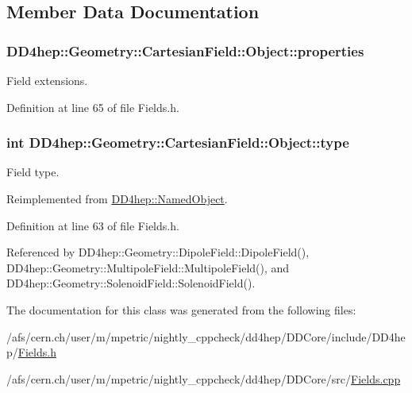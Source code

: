 \subsection{Member Data Documentation}
\hypertarget{class_d_d4hep_1_1_geometry_1_1_cartesian_field_1_1_object_a146cdd5fa292df237112a461ccaa0f6c}{
\subsubsection[{properties}]{ {\bf DD4hep::Geometry::CartesianField::Object::properties}}}
\label{class_d_d4hep_1_1_geometry_1_1_cartesian_field_1_1_object_a146cdd5fa292df237112a461ccaa0f6c}


Field extensions. 

Definition at line 65 of file Fields.h.\hypertarget{class_d_d4hep_1_1_geometry_1_1_cartesian_field_1_1_object_a661abde32b68651dc0542aabbe9e448c}{
\subsubsection[{type}]{\setlength{\rightskip}{0pt plus 5cm}int {\bf DD4hep::Geometry::CartesianField::Object::type}}}
\label{class_d_d4hep_1_1_geometry_1_1_cartesian_field_1_1_object_a661abde32b68651dc0542aabbe9e448c}


Field type. 

Reimplemented from \hyperlink{class_d_d4hep_1_1_named_object_a8e17bb5f854b320302be44c68c39a192}{DD4hep::NamedObject}.

Definition at line 63 of file Fields.h.

Referenced by DD4hep::Geometry::DipoleField::DipoleField(), DD4hep::Geometry::MultipoleField::MultipoleField(), and DD4hep::Geometry::SolenoidField::SolenoidField().

The documentation for this class was generated from the following files:\begin{DoxyCompactItemize}
\item 
/afs/cern.ch/user/m/mpetric/nightly\_\-cppcheck/dd4hep/DDCore/include/DD4hep/\hyperlink{_fields_8h}{Fields.h}\item 
/afs/cern.ch/user/m/mpetric/nightly\_\-cppcheck/dd4hep/DDCore/src/\hyperlink{_fields_8cpp}{Fields.cpp}\end{DoxyCompactItemize}
